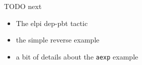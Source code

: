 \begin{metanote}
  TODO next
  \begin{itemize}
  \item The elpi dep-pbt tactic
  \item the simple reverse example
  \item a bit of details about the \texttt{aexp} example
  \end{itemize}
\end{metanote}

